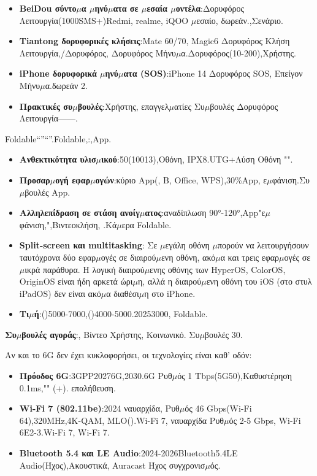 \begin{itemize}
  \item \textbf{BeiDou σύντο$\mu$α $\mu$ηνύ$\mu$ατα σε $\mu$εσαία $\mu$οντέλα}:Δορυφόρος Λειτουργία(1000SMS+)Redmi, realme, iQOO $\mu$εσαίο, δωρεάν.,Σενάριο.
  \item \textbf{Tiantong δορυφορικές κλήσεις}:Mate 60/70, Magic6 Δορυφόρος Κλήση Λειτουργία,/Δορυφόρος, Δορυφόρος Μήνυ$\mu$α.Δορυφόρος(10-200),Χρήστης.
  \item \textbf{iPhone δορυφορικά $\mu$ηνύ$\mu$ατα (SOS)}:iPhone 14 Δορυφόρος SOS, Επείγον Μήνυ$\mu$α.δωρεάν 2.
  \item \textbf{Πρακτικές συ$\mu$βουλές}:Χρήστης, επαγγελ$\mu$ατίες Συ$\mu$βουλές Δορυφόρος Λειτουργία——.
\end{itemize}


Foldable“”“”.Foldable,:,App.

\begin{itemize}
  \item \textbf{Ανθεκτικότητα υλισ$\mu$ικού}:50(10013),Οθόνη, IPX8.UTG+Λύση Οθόνη "".
  \item \textbf{Προσαρ$\mu$ογή εφαρ$\mu$ογών}:κύριο App(, B, Office, WPS),30\%App, ε$\mu$φάνιση.Συ$\mu$βουλές App.
  \item \textbf{Αλληλεπίδραση σε στάση ανοίγ$\mu$ατος}:αναδίπλωση 90°-120°,App"ε$\mu$φάνιση,",Βιντεοκλήση, .Κά$\mu$ερα Foldable.
  \item \textbf{Split-screen και multitasking}: Σε $\mu$εγάλη οθόνη $\mu$πορούν να λειτουργήσουν ταυτόχρονα δύο εφαρ$\mu$ογές σε διαιρού$\mu$ενη οθόνη, ακό$\mu$α και τρεις εφαρ$\mu$ογές σε $\mu$ικρά παράθυρα. Η λογική διαιρού$\mu$ενης οθόνης των HyperOS, ColorOS, OriginOS είναι ήδη αρκετά ώρι$\mu$η, αλλά η διαιρού$\mu$ενη οθόνη του iOS (στο στυλ iPadOS) δεν είναι ακό$\mu$α διαθέσι$\mu$η στο iPhone.
  \item \textbf{Τι$\mu$ή}:()5000-7000,()4000-5000.20253000, Foldable.
\end{itemize}

\textbf{Συ$\mu$βουλές αγοράς}:, Βίντεο Χρήστης, Κοινωνικό. Συ$\mu$βουλές 30.


Αν και το 6G δεν έχει κυκλοφορήσει, οι τεχνολογίες είναι καθ' οδόν:

\begin{itemize}
  \item \textbf{Πρόοδος 6G}:3GPP20276G,2030.6G Ρυθ$\mu$ός 1 Tbps(5G50),Καθυστέρηση 0.1ms,"" (+). επαλήθευση.
  \item \textbf{Wi-Fi 7 (802.11be)}:2024 ναυαρχίδα, Ρυθ$\mu$ός 46 Gbps(Wi-Fi 64),320MHz,4K-QAM, MLO().Wi-Fi 7, ναυαρχίδα Ρυθ$\mu$ός 2-5 Gbps, Wi-Fi 6E2-3.Wi-Fi 7, Wi-Fi 7.
  \item \textbf{Bluetooth 5.4 και LE Audio}:2024-2026Bluetooth5.4LE Audio(Ήχος),Ακουστικά, Auracast Ήχος συγχρονισ$\mu$ός.
\end{itemize}


